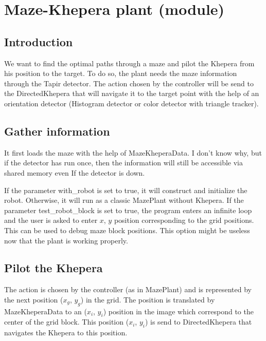 \section{Maze-Khepera plant (module)}
\label{sec:mkp}

\subsection{Introduction}
\label{sec:mkp:intro}

We want to find the optimal paths through a maze and pilot the Khepera 
from his position to the target. To do so, the plant needs the maze 
information through the Tapir detector. The action chosen by the 
controller will be send to the DirectedKhepera that will navigate it 
to the target point with the help of an orientation detector 
(Histogram detector or color detector with triangle tracker).

\subsection{Gather information}
\label{sec:mkp:gather}

It first loads the maze with the help of MazeKheperaData. I don’t know 
why, but if the detector has run once, then the information will still 
be accessible via shared memory even If the detector is down. 

If the parameter with\_robot is set to true, it will construct and 
initialize the robot. Otherwise, it will run as a classic MazePlant 
without Khepera.
If the parameter test\_robot\_block is set to true, the program enters an 
infinite loop and the user is asked to enter $x$, $y$ position 
corresponding 
to the grid positions. This can be used to debug maze block positions. 
This option might be useless now that the plant is working properly.

\subsection{Pilot the Khepera}
\label{sec:mkp:pilot}

The action is chosen by the controller (as in MazePlant) and 
is represented by the next position ($x_g$, $y_g$) in the grid. 
The position is translated by MazeKheperaData to an ($x_i$, $y_i$) position 
in the image which correspond to the center of the grid block. This 
position ($x_i$, $y_i$) is send to DirectedKhepera that navigates the 
Khepera to this position.

